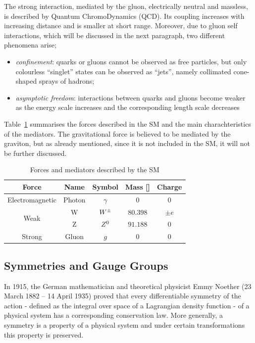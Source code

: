 			The strong interaction, mediated by the gluon, electrically neutral and massless, is described by Quantum ChromoDynamics (QCD). Its coupling increases with increasing distance and is smaller at short range. Moreover, due to gluon self interactions, which will be discussed in the next paragraph, two different phenomena arise; 

			\begin{itemize}
				\item \emph{confinement}: quarks or gluons cannot be observed as free particles, but only colourless “singlet” states can be observed as “jets”, namely collimated cone-shaped sprays of hadrons; 
				\item \emph{asymptotic freedom}: interactions between quarks and gluons become weaker as the energy scale increases and the corresponding length scale decreases
			\end{itemize}

			Table~\ref{tab:interactions} summarises the forces described in the SM and the main charachteristics of the mediators. The gravitational force is believed to be mediated by the graviton, but as already mentioned, since it is not included in the SM, it will not be further discussed.

			\begin{table}[!htb]\centering\caption{Forces and mediators described by the SM}							
				\begin{tabular}{c|c|c|c|c}
					\hline \hline
					\textbf{Force} & \textbf{Name} & \textbf{Symbol} & \textbf{Mass} [\GeV]& \textbf{Charge} \\ \hline \hline
					Electromagnetic & Photon & $\gamma$ & 0 & 0 \\ \hline
					\multirow{2}{*}{Weak} & W & $W^{\pm}$ & $80.398$ & $\pm e$ \\
					& Z & $Z^0$ & $91.188$ & 0 \\\hline
					Strong & Gluon & $g$ & $0$ & $0$ \\\hline\hline
				\end{tabular}						
			\label{tab:interactions} 
			\end{table}



		\subsection*{Symmetries and Gauge Groups}

			In 1915, the German mathematician and theoretical physicist Emmy Noether (23 March 1882 – 14 April 1935) proved that every differentiable symmetry of the action - defined as the integral over space of a Lagrangian density function - of a physical system has a corresponding conservation law. More generally, a symmetry is a property of a physical system and under certain transformations this property is preserved. 

